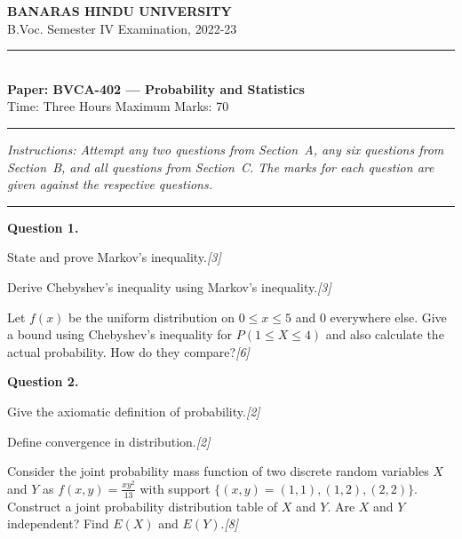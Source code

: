 \documentclass[11pt,a4paper]{article}
\newcommand{\pts}[1]{\hfill   \textit{[#1]}}
\begin{document}
\begin{center}
  {\large\bfseries BANARAS HINDU UNIVERSITY}\\[2pt]
  {\normalsize B.Voc. Semester IV Examination, 2022-23}\\[6pt]
  \rule{0.8\linewidth}{0.5pt}\\[6pt]
  {\large\bfseries Paper: BVCA-402 --- Probability and Statistics}\\[4pt]
  {\normalsize Time: Three Hours \hfill Maximum Marks: 70}
\end{center}

\rule{1.0\linewidth}{0.4pt}

\smallskip



\noindent   \textit{Instructions: Attempt any two questions from Section~A, any six questions from Section~B, and all questions from Section~C. The marks for each question are given against the respective questions.}

\bigskip

\bigskip


\rule{\linewidth}{0.4pt}\smallskip

\medskip


\noindent   \textbf{Question 1.}

\begin{parts}
  \item State and prove Markov's inequality.\pts{3}
  \item Derive Chebyshev's inequality using Markov's inequality.\pts{3}
  \item Let $f(x)$ be the uniform distribution on $0 \le x \le 5$ and $0$ everywhere else. Give a bound using Chebyshev's inequality for $P(1 \le X \le 4)$ and also calculate the actual probability. How do they compare?\pts{6}
\end{parts}

\medskip


\noindent   \textbf{Question 2.}

\begin{parts}
  \item Give the axiomatic definition of probability.\pts{2}
  \item Define convergence in distribution.\pts{2}
  \item Consider the joint probability mass function of two discrete random variables $X$ and $Y$ as $f(x, y) = \frac{xy^2}{13}$ with support $\{(x, y) = (1,1), (1, 2), (2, 2)\}$. Construct a joint probability distribution table of $X$ and $Y$. Are $X$ and $Y$ independent? Find $E(X)$ and $E(Y)$.\pts{8}
\end{parts}
\end{document}
